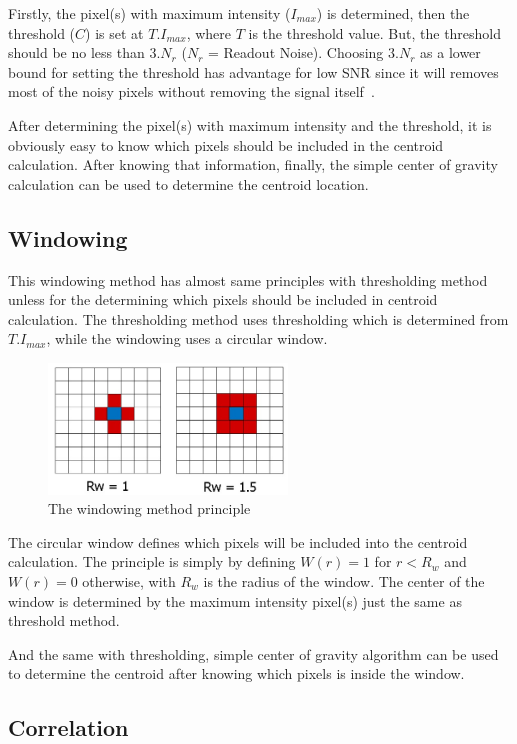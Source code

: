 \documentclass{article}
\begin{document}
Firstly, the pixel(s) with maximum intensity ($I_{max}$) is determined, then the threshold ($C$) is set at $T.I_{max}$, where $T$ is the threshold value. But, the threshold should be no less than $3.N_r$ ($N_r$ = Readout Noise). Choosing $3.N_r$ as a lower bound for setting the threshold has advantage for low SNR since it will removes most of the noisy pixels without removing the signal itself~\cite{thomas04}.

After determining the pixel(s) with maximum intensity and the threshold, it is obviously easy to know which pixels should be included in the centroid calculation. After knowing that information, finally, the simple center of gravity calculation can be used to determine the centroid location.

\subsection{Windowing}

This windowing method has almost same principles with thresholding method unless for the determining which pixels should be included in centroid calculation. The thresholding method uses thresholding which is determined from $T.I_{max}$, while the windowing uses a circular window. 

\begin{figure}[H]
    \centering
    \includegraphics[width=2.5in]{figures/window.jpg}
    \caption{The windowing method principle}
    \label{fig:window}
\end{figure}

The circular window defines which pixels will be included into the centroid calculation. The principle is simply by defining $W(r)=1$ for $r<R_w$ and $W(r)=0$ otherwise, with $R_w$ is the radius of the window. The center of the window is determined by the maximum intensity pixel(s) just the same as threshold method.

And the same with thresholding, simple center of gravity algorithm can be used to determine the centroid after knowing which pixels is inside the window.

\subsection{Correlation}
\end{document}
